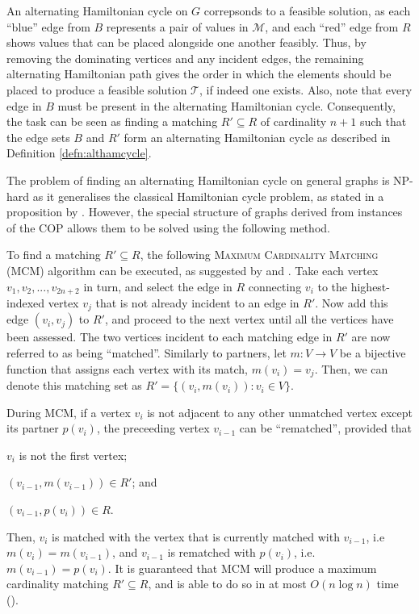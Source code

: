 \documentclass[oribibl]{llncs}
\begin{document}
An alternating Hamiltonian cycle on $G$ correpsonds to a feasible solution, as each ``blue'' edge from $B$ represents a pair of values in $\mathcal{M}$, and each ``red'' edge from $R$ shows values that can be placed alongside one another feasibly. Thus, by removing the dominating vertices and any incident edges, the remaining alternating Hamiltonian path gives the order in which the elements should be placed to produce a feasible solution $\mathcal{T}$, if indeed one exists. Also, note that every edge in $B$ must be present in the alternating Hamiltonian cycle. Consequently, the task can be seen as finding a matching $R' \subseteq R$ of cardinality $n+1$ such that the edge sets $B$ and $R'$ form an alternating Hamiltonian cycle as described in Definition \ref{defn:althamcycle}. 

The problem of finding an alternating Hamiltonian cycle on general graphs is NP-hard as it generalises the classical Hamiltonian cycle problem, as stated in a proposition by \cite{haggkvist1977}. However, the special structure of graphs derived from instances of the COP allows them to be solved using the following method.

To find a matching $R' \subseteq R$, the following \textsc{Maximum Cardinality Matching} (MCM) algorithm can be executed, as suggested by \cite{mahadev1994} and \cite{becker2010}. Take each vertex $v_1, v_2,..., v_{2n+2}$ in turn, and select the edge in $R$ connecting $v_i$ to the highest-indexed vertex $v_j$ that is not already incident to an edge in $R'$. Now add this edge $(v_i, v_j)$ to $R'$, and proceed to the next vertex until all the vertices have been assessed. The two vertices incident to each matching edge in $R'$ are now referred to as being ``matched''. Similarly to partners, let $m : V \to V$ be a bijective function that assigns each vertex with its match, $m(v_i) = v_j$. Then, we can denote this matching set as $R' =\{(v_i, m(v_i)) : v_i \in V\}$. 

During MCM, if a vertex $v_i$ is not adjacent to any other unmatched vertex except its partner $p(v_i)$, the preceeding vertex $v_{i-1}$ can be ``rematched'', provided that 
\begin{enumerate*}[label={(\alph*)}]
	\item $v_i$ is not the first vertex; 
	\item $(v_{i-1}, m(v_{i-1})) \in R'$; and
	\item $(v_{i-1}, p(v_i)) \in R$.
\end{enumerate*}
Then, $v_i$ is matched with the vertex that is currently matched with $v_{i-1}$, i.e $m(v_i) = m(v_{i-1})$, and $v_{i-1}$ is rematched with $p(v_i)$, i.e. $m(v_{i-1}) = p(v_i)$. It is guaranteed that MCM will produce a maximum cardinality matching $R' \subseteq R$, and is able to do so in at most $O(n \log n)$ time (\citealp{mahadev1994}).
\end{document}
